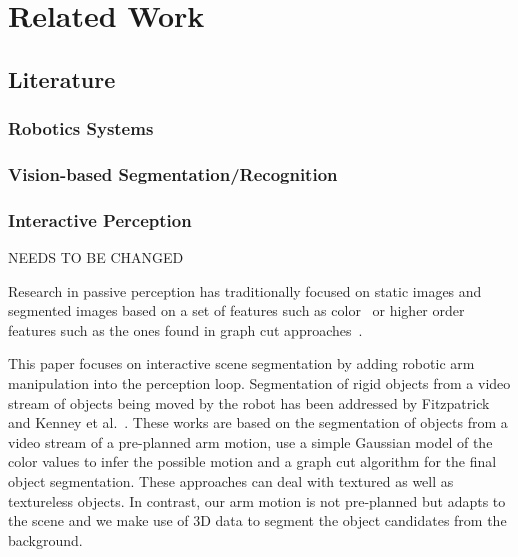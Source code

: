 \chapter{Related Work}
\label{chapter:Related Work}


\section{Literature}
\subsection{Robotics Systems}
\subsection{Vision-based Segmentation/Recognition}
\subsection{Interactive Perception}

NEEDS TO BE CHANGED

Research in passive perception has traditionally focused on  static 
images and segmented images based on a  set of features  such as color~\cite{Balch_2000_3584}  
or higher order  features  such as the ones found in graph  cut  approaches~\cite{BoykovGraphCut}.

This paper focuses on interactive scene segmentation by adding robotic
arm manipulation  into the perception  loop.
Segmentation of rigid objects from a video stream 
of objects being moved by the robot has been addressed by Fitzpatrick
~\cite{fitzpatrick_active_vision} and Kenney et al.~\cite{KenneyInteractive}. 
These works are based on the segmentation of objects from a video stream 
of a pre-planned arm motion, use a simple Gaussian model of the color values 
to infer the possible motion and a graph cut algorithm for the final object 
segmentation. These approaches can deal with textured as well as textureless objects. 
In contrast, our arm motion is not pre-planned but adapts to the scene
and we make use of 3D data to segment the object candidates from
the background.

